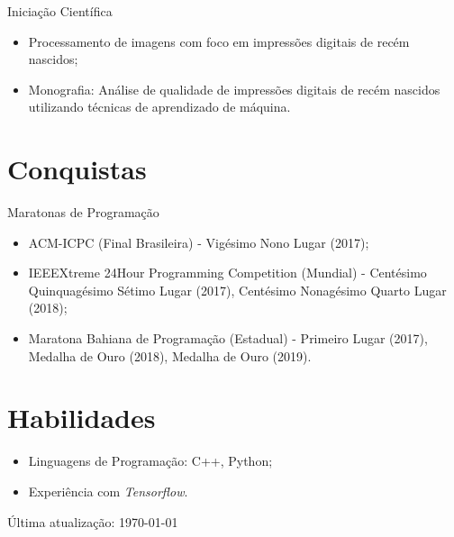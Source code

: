 \documentclass[letterpaper]{article}
\def\footerlink{}
\begin{document}
  Iniciação Científica
  \begin{itemize}
    \item Processamento de imagens com foco em impressões digitais de recém nascidos;
    \item Monografia: Análise de qualidade de impressões digitais de recém nascidos utilizando técnicas de aprendizado de máquina.
  \end{itemize}


\section*{Conquistas}

Maratonas de Programação

\begin{itemize}
  \item ACM-ICPC (Final Brasileira) - Vigésimo Nono Lugar (2017);
  \item IEEEXtreme 24Hour Programming Competition (Mundial) - Centésimo Quinquagésimo Sétimo Lugar (2017), Centésimo Nonagésimo Quarto Lugar (2018);
  \item Maratona Bahiana de Programação (Estadual) - Primeiro Lugar (2017), Medalha de Ouro (2018), Medalha de Ouro (2019).
\end{itemize}

\section*{Habilidades}
\begin{itemize}
  \item Linguagens de Programação: C++, Python;
  \item Experiência com \textit{Tensorflow}.
\end{itemize}

\bigskip

\begin{center}
  \begin{footnotesize}
    Última atualização: \today \\
    \href{\footerlink}{\texttt{\footerlink}}
  \end{footnotesize}
\end{center}
\end{document}
